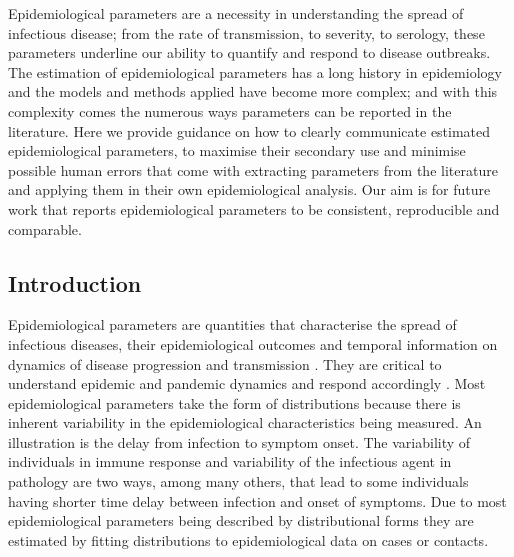 \documentclass[
  10pt,
  letterpaper,
]{article}
\begin{document}
\linenumbers

Epidemiological parameters are a necessity in understanding the spread
of infectious disease; from the rate of transmission, to severity, to
serology, these parameters underline our ability to quantify and respond
to disease outbreaks. The estimation of epidemiological parameters has a
long history in epidemiology and the models and methods applied have
become more complex; and with this complexity comes the numerous ways
parameters can be reported in the literature. Here we provide guidance
on how to clearly communicate estimated epidemiological parameters, to
maximise their secondary use and minimise possible human errors that
come with extracting parameters from the literature and applying them in
their own epidemiological analysis. Our aim is for future work that
reports epidemiological parameters to be consistent, reproducible and
comparable.

\subsection{Introduction}\label{introduction}

Epidemiological parameters are quantities that characterise the spread
of infectious diseases, their epidemiological outcomes and temporal
information on dynamics of disease progression and transmission
\citep{coriInferenceEpidemicDynamics2024}. They are critical to
understand epidemic and pandemic dynamics and respond accordingly
\citep{polonskyOutbreakAnalyticsDeveloping2019}. Most epidemiological
parameters take the form of distributions because there is inherent
variability in the epidemiological characteristics being measured. An
illustration is the delay from infection to symptom onset. The
variability of individuals in immune response and variability of the
infectious agent in pathology are two ways, among many others, that lead
to some individuals having shorter time delay between infection and
onset of symptoms. Due to most epidemiological parameters being
described by distributional forms they are estimated by fitting
distributions to epidemiological data on cases or contacts.
\end{document}
